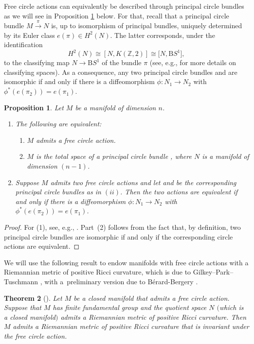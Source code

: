 \documentclass[10pt,a4paper]{amsart}
\numberwithin{equation}{section}
\newtheorem{Theorem}{Theorem}[section]
\newtheorem{Proposition}[Theorem]{Proposition}
\theoremstyle{definition}
\numberwithin{table}{section}
\newcommand{\Z}{\mathbb{Z}}
\begin{document}
Free circle actions can equivalently be described through principal circle bundles as we will see in Proposition \ref{P:action=bdl} below. For that, recall that a principal circle bundle $M\xrightarrow{\pi}N$ is, up to isomorphism of principal bundles, uniquely determined by its Euler class $e(\pi)\in H^2(N)$. The latter corresponds, under the identification
\[H^2(N)\cong[N,K(\Z,2)]\cong \bigl[N,\mathrm{B}S^1\bigr],\]
to the classifying map $N\to \mathrm{B}S^1$ of the bundle $\pi$ (see, e.g., \cite[Sections 4.10--4.13]{Hu94} for more details on classifying spaces). As a consequence, any two principal circle bundles  and  are isomorphic if and only if there is a diffeomorphism $\phi\colon N_1\to N_2$ with ${\phi^*(e(\pi_2))=e(\pi_1)}$.

\begin{Proposition}\label{P:action=bdl}
	Let $M$ be a manifold of dimension $n$.
	\begin{enumerate}\itemsep=0pt
		\item[$(1)$] The following are equivalent:
		\begin{enumerate}[$(i)$]\itemsep=0pt
			\item $M$ admits a free circle action.
			\item $M$ is the total space of a principal circle bundle , where $N$ is a manifold of dimension $(n-1)$.
		\end{enumerate}
		\item[$(2)$] Suppose $M$ admits two free circle actions and let  and  be the corresponding principal circle bundles as in $(ii)$. Then the two actions are equivalent if and only if there is a diffeomorphism $\phi\colon N_1\to N_2$ with $\phi^*(e(\pi_2))=e(\pi_1)$.
	\end{enumerate}
\end{Proposition}
\begin{proof}
	For (1), see, e.g., \cite[Corollary~VI.2.5]{Br72a}. Part~(2) follows from the fact that, by definition, two principal circle bundles are isomorphic if and only if the corresponding circle actions are equivalent.
\end{proof}

We will use the following result to endow manifolds with free circle actions with a Riemannian metric of positive Ricci curvature, which is due to Gilkey--Park--Tuschmann \cite{GPT98}, with a~preliminary version due to B\'erard-Bergery \cite{BB78}.
\begin{Theorem}[{\cite{BB78,GPT98}}]\label{T:Ric>0_bdl}
	Let $M$ be a closed manifold that admits a free circle action. Suppose that $M$ has finite fundamental group and the quotient space $N$ $($which is a closed manifold$)$ admits a Riemannian metric of positive Ricci curvature. Then $M$ admits a Riemannian metric of positive Ricci curvature that is invariant under the free circle action.
\end{Theorem}
\end{document}

